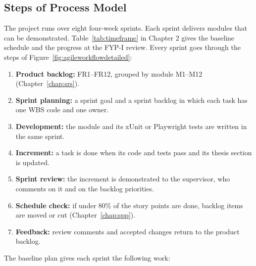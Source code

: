 \subsection{Steps of Process Model}

The project runs over eight four-week sprints. Each sprint delivers modules that can be demonstrated. Table~\ref{tab:timeframe} in Chapter 2 gives the baseline schedule and the progress at the FYP-I review. Every sprint goes through the steps of Figure~\ref{fig:agileworkflowdetailed}:
\begin{enumerate}[noitemsep]
\item \textbf{Product backlog:} FR1--FR12, grouped by module M1--M12 (Chapter~\ref{chap:srs}).
\item \textbf{Sprint planning:} a sprint goal and a sprint backlog in which each task has one WBS code and one owner.
\item \textbf{Development:} the module and its xUnit or Playwright tests are written in the same sprint.
\item \textbf{Increment:} a task is done when its code and tests pass and its thesis section is updated.
\item \textbf{Sprint review:} the increment is demonstrated to the supervisor, who comments on it and on the backlog priorities.
\item \textbf{Schedule check:} if under 80\% of the story points are done, backlog items are moved or cut (Chapter~\ref{chap:spp}).
\item \textbf{Feedback:} review comments and accepted changes return to the product backlog.
\end{enumerate}
The baseline plan gives each sprint the following work:

